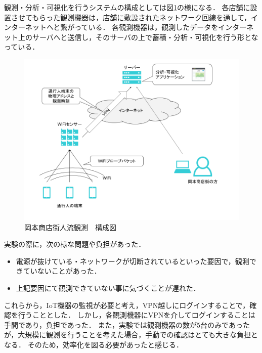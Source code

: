 観測・分析・可視化を行うシステムの構成としては図\ref{fig:okamoto_diag1}の様になる．
各店舗に設置させてもらった観測機器は，店舗に敷設されたネットワーク回線を通して，インターネットへと繋がっている．
各観測機器は，観測したデータをインターネット上のサーバへと送信し，そのサーバの上で蓄積・分析・可視化を行う形となっている．
\begin{figure}[htb]
\includegraphics[width=16cm]{images/okamoto_diag1.png}
\caption{岡本商店街人流観測　構成図}
\label{fig:okamoto_diag1}
\end{figure}
\medskip

実験の際に，次の様な問題や負担があった．
\begin{itemize}
\item 電源が抜けている・ネットワークが切断されているといった要因で，観測できていないことがあった．
\item 上記要因にて観測できていない事に気づくことが遅れた．
\end{itemize}
これらから，IoT機器の監視が必要と考え，VPN越しにログインすることで，確認を行うこととした．
しかし，各観測機器にVPNを介してログインすることは手間であり，負担であった．
また，実験では観測機器の数が5台のみであったが，大規模に観測を行うことを考えた場合，手動での確認はとても大きな負担となる．
そのため，効率化を図る必要があったと感じる．

